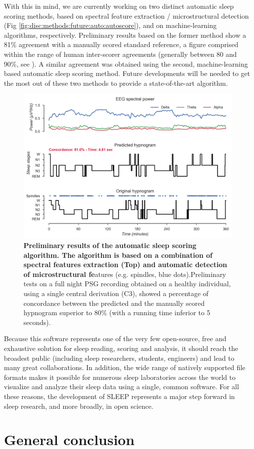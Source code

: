 With this in mind, we are currently working on two distinct automatic sleep scoring methods, based on spectral feature extraction / microstructural detection (Fig \ref{fig:disc:methods:future:auto:autoscore}), and on machine-learning algorithms, respectively. Preliminary results based on the former method show a 81\% agreement with a manually scored standard reference, a figure comprised within the range of human inter-scorer agreements (generally between 80 and 90\%, see \citealp{silber_visual_2007}). A similar agreement was obtained using the second, machine-learning based automatic sleep scoring method. Future developments will be needed to get the most out of these two methods to provide a state-of-the-art algorithm.

\begin{figure}[htb]
	\includegraphics[width=\textwidth]{Fig/Discussion/autoscore.png}
	\caption[Preliminary results of the automatic sleep scoring algorithm]{\textbf{Preliminary results of the automatic sleep scoring algorithm. The algorithm is based on a combination of spectral features extraction (Top) and automatic detection of microstructural fe}atures (e.g. spindles, blue dots).Preliminary tests on a full night PSG recording obtained on a healthy individual, using a single central derivation (C3), showed a percentage of concordance between the predicted and the manually scored hypnogram superior to 80\% (with a running time inferior to 5 seconds).}
	\label{fig:disc:methods:future:autoscore}
\end{figure}

Because this software represents one of the very few open-source, free and exhaustive solution for sleep reading, scoring and analysis, it should reach the broadest public (including sleep researchers, students, engineers) and lead to many great collaborations. In addition, the wide range of natively supported file formats makes it possible for numerous sleep laboratories across the world to visualize and analyze their sleep data using a single, common software. For all these reasons, the development of SLEEP represents a major step forward in sleep research, and more broadly, in open science.


\cleardoublepage
\chapter{General conclusion}
\label{disc:conclusion}
